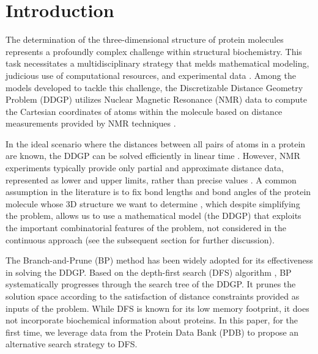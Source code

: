 \documentclass[journal=jacsat,manuscript=article]{achemso}
\begin{document}
\section{Introduction}
{\color{red}

The determination of the three-dimensional structure of protein molecules represents a profoundly complex challenge within structural biochemistry. This task necessitates a multidisciplinary strategy that melds mathematical modeling, judicious use of computational resources, and experimental data \cite{donald2011algorithmsStructMolBios, schlick2010molecular}. Among the models developed to tackle this challenge, the Discretizable Distance Geometry Problem (DDGP) utilizes Nuclear Magnetic Resonance (NMR) data to compute the Cartesian coordinates of atoms within the molecule based on distance measurements provided by NMR techniques \cite{mucherino2012theDiscretDGP}.

In the ideal scenario where the distances between all pairs of atoms in a protein are known, the DDGP can be solved efficiently in linear time \cite{wu2002}. However, NMR experiments typically provide only partial and approximate distance data, represented as lower and upper limits, rather than precise values \cite{wuthrich1989ProteinStructure}. A common assumption in the literature is to fix bond lengths and bond angles of the protein molecule whose 3D structure we want to determine \cite{crippen1988}, which despite simplifying the problem, allows us to use a mathematical model (the DDGP) that exploits the important combinatorial features of the problem, not considered in the continuous approach (see the subsequent section for further discussion).

The Branch-and-Prune (BP) method \cite{liberti2014euclidean} has been widely adopted for its effectiveness in solving the DDGP. Based on the depth-first search (DFS) algorithm \cite{cormen2022introduction}, BP systematically progresses through the search tree of the DDGP. It prunes the solution space according to the satisfaction of distance constraints provided as inputs of the problem. While DFS is known for its low memory footprint, it does not incorporate biochemical information about proteins. In this paper, for the first time, we leverage data from the Protein Data Bank (PDB) \cite{berman2000ProteinDataBank} to propose an alternative search strategy to DFS.

}
\end{document}
